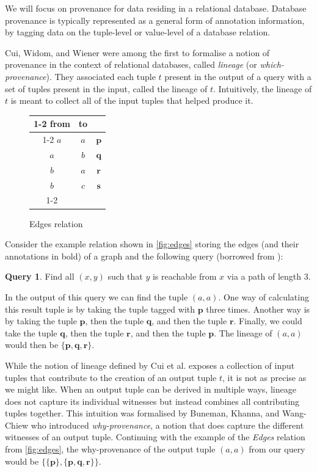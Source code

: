 \documentclass[oneside, 11pt]{amsbook}
\theoremstyle{plain}
\theoremstyle{definition}
\newtheorem{query}[thm]{Query}
\theoremstyle{remark}
\begin{document}
We will focus on provenance for data residing in a relational database. Database provenance is typically represented as a general form of annotation information, by tagging data on the tuple-level or value-level of a database relation.

Cui, Widom, and Wiener \cite{Cui2000} were among the first to formalise a notion of provenance in the context of relational databases, called \emph{lineage} (or \emph{which-provenance}). They associated each tuple $t$ present in the output of a query with a set of tuples present in the input, called the lineage of $t$. Intuitively, the lineage of $t$ is meant to collect all of the input tuples that helped produce it.

\begin{figure}[htbp]
    \centering
    \begin{tabular}{|c|c|c}
        \cline{1-2}
        from & to  &              \\ \cline{1-2}
        $a$  & $a$ & $\mathbf{p}$ \\
        $a$  & $b$ & $\mathbf{q}$ \\
        $b$  & $a$ & $\mathbf{r}$ \\
        $b$  & $c$ & $\mathbf{s}$ \\ \cline{1-2}
    \end{tabular}
    \caption{Edges relation}
    \label{fig:edges}
\end{figure}

Consider the example relation shown in \autoref{fig:edges} storing the edges (and their annotations in bold) of a graph and the following query (borrowed from \cite{Karvounarakis2012}):

\begin{query}
    \label{query:3edges}
    Find all $(x,y)$ such that $y$ is reachable from $x$ via a path of length 3.
\end{query}

In the output of this query we can find the tuple $(a,a)$. One way of calculating this result tuple is by taking the tuple tagged with $\textbf{p}$ three times. Another way is by taking the tuple $\textbf{p}$, then the tuple $\textbf{q}$, and then the tuple $\textbf{r}$. Finally, we could take the tuple $\textbf{q}$, then the tuple $\textbf{r}$, and then the tuple $\textbf{p}$. The lineage of $(a,a)$ would then be $\{\textbf{p}, \textbf{q}, \textbf{r}\}$.

While the notion of lineage defined by Cui et al. exposes a collection of input tuples that contribute to the creation of an output tuple $t$, it is not as precise as we might like. When an output tuple can be derived in multiple ways, lineage does not capture its individual witnesses but instead combines all contributing tuples together. This intuition was formalised by Buneman, Khanna, and Wang-Chiew \cite{Buneman2001} who introduced \emph{why-provenance}, a notion that does capture the different witnesses of an output tuple. Continuing with the example of the \textit{Edges} relation from \autoref{fig:edges}, the why-provenance of the output tuple $(a,a)$ from our query would be $\{ \{\textbf{p}\}, \{\textbf{p}, \textbf{q}, \textbf{r}\}\}$.
\end{document}
